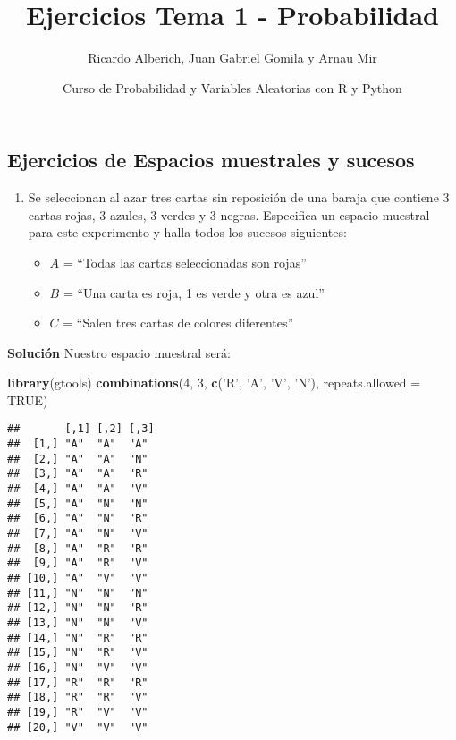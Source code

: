 \documentclass[
]{article}
\title{Ejercicios Tema 1 - Probabilidad}
\author{Ricardo Alberich, Juan Gabriel Gomila y Arnau Mir}
\date{Curso de Probabilidad y Variables Aleatorias con R y Python}
\newenvironment{Shaded}{\begin{snugshade}}{\end{snugshade}}
\newcommand{\DataTypeTok}[1]{\textcolor[rgb]{0.13,0.29,0.53}{#1}}
\newcommand{\DecValTok}[1]{\textcolor[rgb]{0.00,0.00,0.81}{#1}}
\newcommand{\KeywordTok}[1]{\textcolor[rgb]{0.13,0.29,0.53}{\textbf{#1}}}
\newcommand{\NormalTok}[1]{#1}
\newcommand{\OtherTok}[1]{\textcolor[rgb]{0.56,0.35,0.01}{#1}}
\newcommand{\StringTok}[1]{\textcolor[rgb]{0.31,0.60,0.02}{#1}}
\providecommand{\tightlist}{%
  \setlength{\itemsep}{0pt}\setlength{\parskip}{0pt}}
\begin{document}
\maketitle

{
\setcounter{tocdepth}{2}
\tableofcontents
}
\hypertarget{ejercicios-de-espacios-muestrales-y-sucesos}{%
\subsection{Ejercicios de Espacios muestrales y
sucesos}\label{ejercicios-de-espacios-muestrales-y-sucesos}}

\begin{enumerate}
\def\labelenumi{\arabic{enumi}.}
\tightlist
\item
  Se seleccionan al azar tres cartas sin reposición de una baraja que
  contiene 3 cartas rojas, 3 azules, 3 verdes y 3 negras. Especifica un
  espacio muestral para este experimento y halla todos los sucesos
  siguientes:

  \begin{itemize}
  \tightlist
  \item
    \(A\) = ``Todas las cartas seleccionadas son rojas''
  \item
    \(B\) = ``Una carta es roja, 1 es verde y otra es azul''
  \item
    \(C\) = ``Salen tres cartas de colores diferentes''
  \end{itemize}
\end{enumerate}

\textbf{Solución} Nuestro espacio muestral será:

\begin{Shaded}
\begin{Highlighting}[]
\KeywordTok{library}\NormalTok{(gtools)}
\KeywordTok{combinations}\NormalTok{(}\DecValTok{4}\NormalTok{, }\DecValTok{3}\NormalTok{, }\KeywordTok{c}\NormalTok{(}\StringTok{'R'}\NormalTok{, }\StringTok{'A'}\NormalTok{, }\StringTok{'V'}\NormalTok{, }\StringTok{'N'}\NormalTok{), }\DataTypeTok{repeats.allowed =} \OtherTok{TRUE}\NormalTok{)}
\end{Highlighting}
\end{Shaded}

\begin{verbatim}
##       [,1] [,2] [,3]
##  [1,] "A"  "A"  "A" 
##  [2,] "A"  "A"  "N" 
##  [3,] "A"  "A"  "R" 
##  [4,] "A"  "A"  "V" 
##  [5,] "A"  "N"  "N" 
##  [6,] "A"  "N"  "R" 
##  [7,] "A"  "N"  "V" 
##  [8,] "A"  "R"  "R" 
##  [9,] "A"  "R"  "V" 
## [10,] "A"  "V"  "V" 
## [11,] "N"  "N"  "N" 
## [12,] "N"  "N"  "R" 
## [13,] "N"  "N"  "V" 
## [14,] "N"  "R"  "R" 
## [15,] "N"  "R"  "V" 
## [16,] "N"  "V"  "V" 
## [17,] "R"  "R"  "R" 
## [18,] "R"  "R"  "V" 
## [19,] "R"  "V"  "V" 
## [20,] "V"  "V"  "V"
\end{verbatim}
\end{document}
